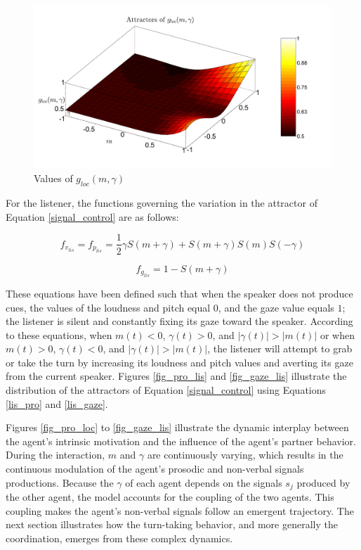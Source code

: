 \documentclass[twocolumn]{svjour3}
\begin{document}
\begin{figure}
\centering
\includegraphics[width=\linewidth]{figure/gazeLoc.pdf}
\caption{Values of $g_{loc}(m,\gamma)$}
\label{fig_gaze_loc}
\end{figure}

For the listener, the functions governing the variation in the attractor of Equation \ref{signal_control} are as follows:
 
\begin{equation}
f_{v_{lis}}= f_{p_{lis}} = \frac{1}{2} \gamma S(m+\gamma) + S(m+\gamma)S(m)S(-\gamma)
\label{lis_pro}
\end{equation}

\begin{equation}
f_{g_{lis}} = 1 - S(m + \gamma)
\label{lis_gaze}
\end{equation}

These equations have been defined such that when the speaker does not produce cues, the values of the loudness and pitch equal $0$, and the gaze value equals $1$; the listener is silent and constantly fixing its gaze toward the speaker. 
According to these equations, when $m(t)<0$, $\gamma(t)>0$, and $|\gamma(t)|>|m(t)|$ or when $m(t)>0$, $\gamma(t)<0$, and $|\gamma(t)|>|m(t)|$, the listener will attempt to grab or take the turn by increasing its loudness and pitch values and averting its gaze from the current speaker. Figures \ref{fig_pro_lis} and \ref{fig_gaze_lis} illustrate the distribution of the attractors of Equation \ref{signal_control} using Equations \ref{lis_pro} and \ref{lis_gaze}.

Figures \ref{fig_pro_loc} to \ref{fig_gaze_lis} illustrate the dynamic interplay between the agent's intrinsic motivation and the influence of the agent's partner behavior.
During the interaction, $m$ and $\gamma$ are continuously varying, which results in the continuous modulation of the agent's prosodic and non-verbal signals productions. Because the $\gamma$ of each agent depends on the signals $s_j$ produced by the other agent, the model accounts for the coupling of the two agents. This coupling makes the agent's non-verbal signals follow an emergent trajectory. The next section illustrates how the turn-taking behavior, and more generally the coordination, emerges from these complex dynamics. 
\end{document}
